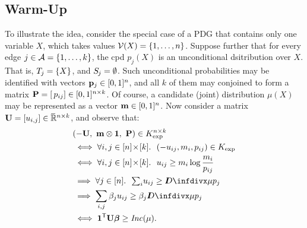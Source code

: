 \documentclass[twoside]{article}
\begin{document}
\subsection{Warm-Up}\label{sec:illust}

To illustrate the idea, consider the special case of a PDG that
contains only one variable $X$, which takes values $\mathcal V(X) = \{1, \ldots, n\}$. 
Suppose further that for every edge $j \in \mathcal A = \{1, \ldots, k\}$, the cpd $p_j(X)$ is an unconditional dsitribution over $X$.
That is, $\Tgt j = \{ X \}$, and $\Src j = \emptyset$.
Such unconditional probabilities may be identified with vectors $\mathbf{p}_j \in [0,1]^n$, and all $k$ of them may conjoined to form a 
matrix $\mathbf{P} = [\,p_{ij}] \in [0,1]^{n \times k}$.
Of course, a candidate (joint) distribution $\mu(X)$
may be represented as a vector $\mathbf{m} \in [0,1]^n$. 
%
Now consider a matrix $\mathbf{U} = [u_{i,j}] \in \mskip1mu\overline{\mskip-1mu\mathbb R\!}\,^{n \times k}$,
and observe that:
\begin{align*}
    &(- \mat U,~ \mat m \otimes \mat 1,~ \mat P) \in K_{\exp}^{n \times k} \\
    &\iff \forall  i,j \in [n]\!\times\![k].~~ 
        (- u_{ij}, m_{i}, p_{ij}) \in K_{\exp} \\
    &\iff \forall  i,j \in [n]\!\times\![k].~~ 
            u_{ij} \ge m_i \log \frac{m_i}{p_{ij}} \\
    &\implies \forall j \in [n].~~  {\textstyle\sum_i} u_{ij}  \ge \kldiv{\mu}{p_j} \\
    &\implies \sum_{i,j} \beta_j u_{ij}  \ge \beta_j \kldiv{\mu}{p_j} \\
    &\iff \mat 1^{\sf T} \mat U \bbeta \ge \Inc(\mu)
    .
\end{align*}
\end{document}
